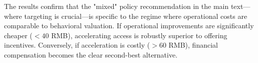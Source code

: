 \documentclass[doublespacing]{utdthesis}
\begin{document}
The results confirm that the "mixed" policy recommendation in the main text---where targeting is crucial---is specific to the regime where operational costs are comparable to behavioral valuation. If operational improvements are significantly cheaper ($<40$ RMB), accelerating access is robustly superior to offering incentives. Conversely, if acceleration is costly ($>60$ RMB), financial compensation becomes the clear second-best alternative.





\begin{thesisbib}

\end{thesisbib}
\end{document}
